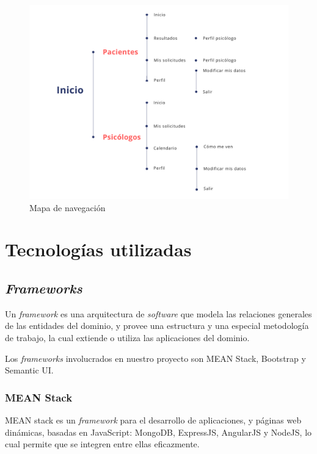 \begin{figure}[htbp] 
    \centering
    \includegraphics[width=1\textwidth]{figuras/Emozio_Mapa_Navegacion.png}
    \caption{Mapa de navegación}
    \label{fig:map-nav}
\end{figure}	

\section{Tecnologías utilizadas}

\subsection{\textit{Frameworks}}
Un \textit{framework} es una arquitectura de \textit{software} que modela las relaciones generales de las entidades del dominio, y provee una estructura y una especial metodología de trabajo, la cual extiende o utiliza las aplicaciones del dominio.


Los \textit{frameworks} involucrados en nuestro proyecto son MEAN Stack, Bootstrap y Semantic UI.


\subsubsection{MEAN Stack}
MEAN stack es un \textit{framework} para el desarrollo de aplicaciones, y páginas web dinámicas, basadas en JavaScript: MongoDB, ExpressJS, AngularJS y NodeJS, lo cual permite que se integren entre ellas eficazmente.


